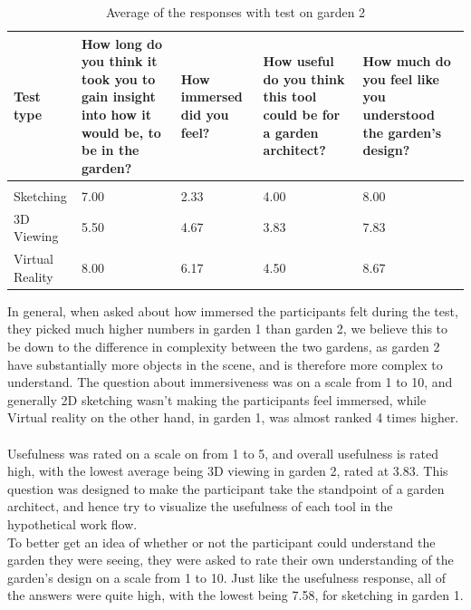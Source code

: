 \begin{table}[H]
	\centering
	\caption{Average of the responses with test on garden 2}
	\label{table:averageResponseGarden2}
	\begin{tabular}{p{3cm}|p{3cm}|p{2cm}|p{3cm}|p{3cm}}
		Test type       & How long do you think it took you to gain insight into how it would be, to be in the garden? & How immersed did you feel? & How useful do you think this tool could be for a garden architect? & How much do you feel like you understood the garden's design? \\ \hline
		&&&&\\
		Sketching       & 7.00                                                                                         & 2.33                       & 4.00                                                               & 8.00                                                          \\
		3D Viewing      & 5.50                                                                                         & 4.67                       & 3.83                                                               & 7.83                                                          \\
		
		Virtual Reality & 8.00                                                                                         & 6.17                       & 4.50                                                               & 8.67                                                         
	\end{tabular}
\end{table}

In general, when asked about how immersed the participants felt during the test, they picked much higher numbers in garden 1 than garden 2, we believe this to be down to the difference in complexity between the two gardens, as garden 2 have substantially more objects in the scene, and is therefore more complex to understand.
The question about immersiveness was on a scale from 1 to 10, and generally 2D sketching wasn't making the participants feel immersed, while Virtual reality on the other hand, in garden 1, was almost ranked 4 times higher.\\\\

Usefulness was rated on a scale on from 1 to 5, and overall usefulness is rated high, with the lowest average being 3D viewing in garden 2, rated at 3.83. This question was designed to make the participant take the standpoint of a garden architect, and hence try to visualize the usefulness of each tool in the hypothetical work flow.\\
To better get an idea of whether or not the participant could understand the garden they were seeing, they were asked to rate their own understanding of the garden's design on a scale from 1 to 10. Just like the usefulness response, all of the answers were quite high, with the lowest being 7.58, for sketching in garden 1.\\

